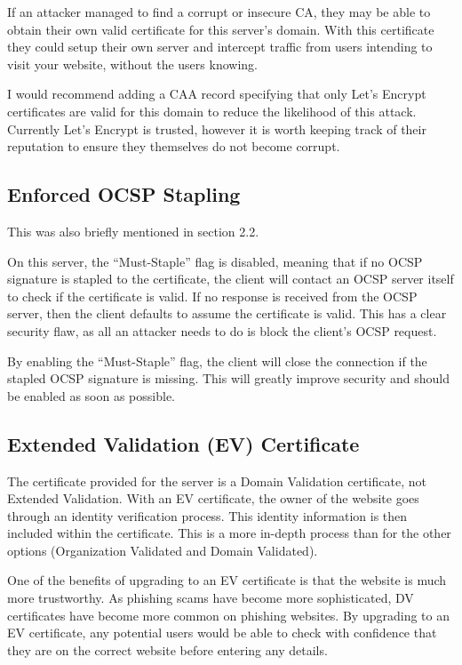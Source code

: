 \documentclass[12pt]{article}
\begin{document}
  If an attacker managed to find a corrupt or insecure CA, they may be able to obtain their own valid certificate for this server's domain.
  With this certificate they could setup their own server and intercept traffic from users intending to visit your website, without the users knowing.

  I would recommend adding a CAA record specifying that only Let's Encrypt certificates are valid for this domain to reduce the likelihood of this attack.
  Currently Let's Encrypt is trusted, however it is worth keeping track of their reputation to ensure they themselves do not become corrupt.


  \subsection{Enforced OCSP Stapling}
  This was also briefly mentioned in section 2.2.

  On this server, the ``Must-Staple'' flag is disabled, meaning that if no OCSP signature is stapled to the certificate, the client will contact an OCSP server itself to check if the certificate is valid.
  If no response is received from the OCSP server, then the client defaults to assume the certificate is valid.
  This has a clear security flaw, as all an attacker needs to do is block the client's OCSP request.

  By enabling the ``Must-Staple'' flag, the client will close the connection if the stapled OCSP signature is missing.
  This will greatly improve security and should be enabled as soon as possible.


  \subsection{Extended Validation (EV) Certificate}
  The certificate provided for the server is a Domain Validation certificate, not Extended Validation.
  With an EV certificate, the owner of the website goes through an identity verification process.
  This identity information is then included within the certificate.
  This is a more in-depth process than for the other options (Organization Validated and Domain Validated).

  One of the benefits of upgrading to an EV certificate is that the website is much more trustworthy.
  As phishing scams have become more sophisticated, DV certificates have become more common on phishing websites.
  By upgrading to an EV certificate, any potential users would be able to check with confidence that they are on the correct website before entering any details.
\end{document}
